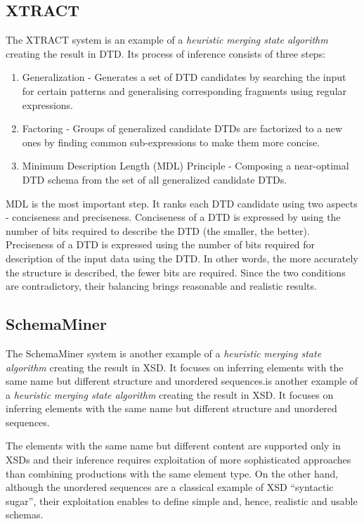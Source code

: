 
\subsection{XTRACT}
The XTRACT  system is an example of a \emph{heuristic} \emph{merging state algorithm} creating the result in DTD. Its process of inference consists of three steps:
\begin{enumerate}
\item Generalization - Generates a set of DTD candidates by searching the input for certain patterns and generalising corresponding fragments using regular expressions.
\item Factoring - Groups of generalized candidate DTDs are factorized to a new ones by finding common sub-expressions to make them more concise. 
\item Minimum Description Length (MDL) Principle - Composing a near-optimal DTD schema from the set of all generalized candidate DTDs.
\end{enumerate}

MDL is the most important step. It ranks each DTD candidate using two aspects - conciseness and preciseness. Conciseness of a DTD is expressed by using the number of bits required to describe the DTD (the smaller, the better). Preciseness of a DTD is expressed using the number of bits required for description of the input data using the DTD. In other words, the more accurately the structure is described, the fewer bits are required. Since the two conditions are contradictory, their balancing brings reasonable and realistic results.

\subsection{SchemaMiner}
The SchemaMiner system  is another example of a \emph{heuristic} \emph{merging state algorithm} creating the result in XSD. It focuses on inferring elements with the same name but different structure and unordered sequences.is another example of a \emph{heuristic} \emph{merging state algorithm} creating the result in XSD. It focuses on inferring elements with the same name but different structure and unordered sequences.

The elements with the same name but different content are supported only in XSDs and their inference requires exploitation of more sophisticated approaches than combining productions with the same element
type. On the other hand, although the unordered sequences are a classical example of XSD “syntactic sugar”, their exploitation enables to define simple and, hence, realistic and usable schemas.

